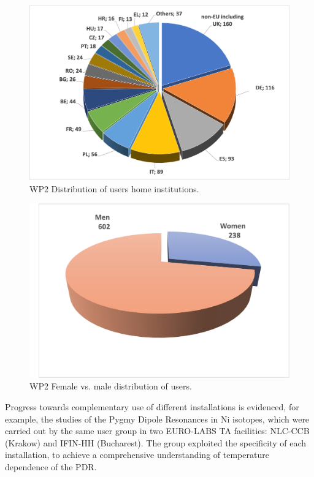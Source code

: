 \begin{figure}[!h]
    \centering
    \includegraphics[width=1.0\linewidth]{graphics/WP2_users_per_country.png}
    \caption{WP2 Distribution of users home institutions.}
    \label{fig:WP2_users_per_country}
\end{figure}

\begin{figure}[!h]
    \centering
    \includegraphics[width=0.6\linewidth]{graphics/WP2_users_men_women.png}
    \caption{WP2 Female vs. male distribution of users.}
    \label{fig:WP2_users_men_women}
\end{figure}

Progress towards complementary use of different installations is evidenced, for example, the studies of the Pygmy Dipole Resonances in Ni isotopes, which were carried out by the same user group in two EURO-LABS TA facilities: NLC-CCB (Krakow) and IFIN-HH (Bucharest). The group exploited the specificity of each installation, to achieve a comprehensive understanding of temperature dependence of the PDR. 

